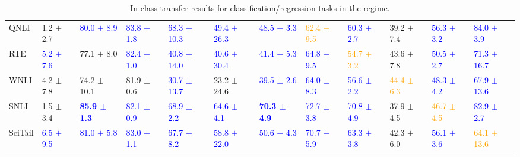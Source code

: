\begin{landscape}
\begin{table}[t]
\begin{adjustbox}{max width=2\textwidth}
\begin{tabular}{ l l l l l  l l l l  l l l }
QNLI & 1.2 $\pm$ 2.7 & \textcolor{blue}{80.0 $\pm$ 8.9} & \textcolor{blue}{83.8 $\pm$ 1.8} & \textcolor{blue}{68.3 $\pm$ 10.3} & \textcolor{blue}{49.4 $\pm$ 26.3} & \textcolor{blue}{48.5 $\pm$ 3.3} & \textcolor{orange}{62.4 $\pm$ 9.5} & \textcolor{blue}{60.3 $\pm$ 2.7} & 39.2 $\pm$ 7.4 & \textcolor{blue}{56.3 $\pm$ 3.2} & \textcolor{blue}{84.0 $\pm$ 3.9}\\
RTE & \textcolor{blue}{5.2 $\pm$ 7.6} & 77.1 $\pm$ 8.0 & \textcolor{blue}{82.4 $\pm$ 1.0} & \textcolor{blue}{40.8 $\pm$ 14.0} & \textcolor{blue}{40.6 $\pm$ 30.4} & \textcolor{blue}{41.4 $\pm$ 5.3} & \textcolor{blue}{64.8 $\pm$ 9.5} & \textcolor{orange}{54.7 $\pm$ 3.2} & 43.6 $\pm$ 7.8 & \textcolor{blue}{50.5 $\pm$ 2.7} & \textcolor{blue}{71.3 $\pm$ 16.7}\\
WNLI & 4.2 $\pm$ 7.8 & 74.2 $\pm$ 10.1 & 81.9 $\pm$ 0.6 & \textcolor{blue}{30.7 $\pm$ 13.7} & 23.2 $\pm$ 24.6 & \textcolor{blue}{39.5 $\pm$ 2.6} & \textcolor{blue}{64.0 $\pm$ 8.3} & \textcolor{blue}{56.6 $\pm$ 2.2} & \textcolor{orange}{44.4 $\pm$ 6.3} & \textcolor{blue}{48.3 $\pm$ 4.2} & \textcolor{blue}{67.9 $\pm$ 13.6}\\
SNLI & 1.5 $\pm$ 3.4 & \textbf{\textcolor{blue}{85.9 $\pm$ 1.3}} & \textcolor{blue}{82.1 $\pm$ 0.9} & \textcolor{blue}{68.9 $\pm$ 2.2} & \textcolor{blue}{64.6 $\pm$ 4.1} & \textbf{\textcolor{blue}{70.3 $\pm$ 4.9}} & \textcolor{blue}{72.7 $\pm$ 3.8} & \textcolor{blue}{70.8 $\pm$ 4.9} & 37.9 $\pm$ 4.5 & \textcolor{orange}{46.7 $\pm$ 4.5} & \textcolor{blue}{82.9 $\pm$ 2.7}\\
SciTail & \textcolor{blue}{6.5 $\pm$ 9.5} & \textcolor{blue}{81.0 $\pm$ 5.8} & \textcolor{blue}{83.0 $\pm$ 1.1} & \textcolor{blue}{67.7 $\pm$ 8.2} & \textcolor{blue}{58.8 $\pm$ 22.0} & \textcolor{blue}{50.6 $\pm$ 4.3} & \textcolor{blue}{70.7 $\pm$ 5.9} & \textcolor{blue}{63.3 $\pm$ 3.8} & 42.3 $\pm$ 6.0 & \textcolor{blue}{56.1 $\pm$ 3.6} & \textcolor{orange}{64.1 $\pm$ 13.6}\\
\bottomrule
\end{tabular}
\end{adjustbox}
\caption{In-class transfer results for classification/regression tasks in the  regime.}
\label{tbla4b}
\end{table}
\end{landscape}